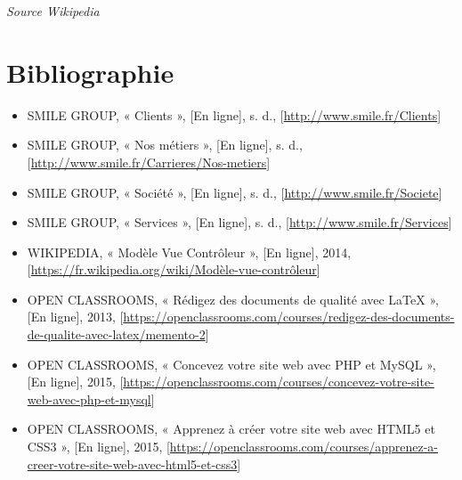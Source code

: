 \documentclass[a4paper,11pt,twoside]{report}
\begin{document}
  \begin{flushright}
    \footnotesize\textit{Source Wikipedia}
  \end{flushright}
  
\chapter*{Bibliographie}
\thispagestyle{\chead{ }}
\begin{itemize}

  \item SMILE GROUP, « Clients », [En ligne], s. d., [\url{http://www.smile.fr/Clients}]
  \item SMILE GROUP, « Nos métiers », [En ligne], s. d., [\url{http://www.smile.fr/Carrieres/Nos-metiers}]
  \item SMILE GROUP, « Société », [En ligne], s. d., [\url{http://www.smile.fr/Societe}]
  \item SMILE GROUP, « Services », [En ligne], s. d., [\url{http://www.smile.fr/Services}]
  \item WIKIPEDIA, « Modèle Vue Contrôleur », [En ligne], 2014, [\url{https://fr.wikipedia.org/wiki/Modèle-vue-contrôleur}]
  \item OPEN CLASSROOMS, « Rédigez des documents de qualité avec LaTeX », [En ligne], 2013, [\url{https://openclassrooms.com/courses/redigez-des-documents-de-qualite-avec-latex/memento-2}]
  \item OPEN CLASSROOMS, « Concevez votre site web avec PHP et MySQL », [En ligne], 2015, [\url{https://openclassrooms.com/courses/concevez-votre-site-web-avec-php-et-mysql}]
  \item OPEN CLASSROOMS, « Apprenez à créer votre site web avec HTML5 et CSS3 », [En ligne], 2015, [\url{https://openclassrooms.com/courses/apprenez-a-creer-votre-site-web-avec-html5-et-css3}]
  
\end{itemize}
  
\listoffigures
\thispagestyle{\chead{ }}
\end{document}
